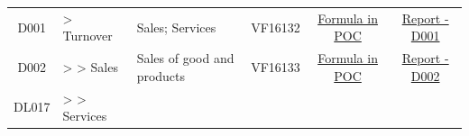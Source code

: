 \documentclass[]{book}
\begin{document}
\begin{longtable}[]{@{}cllccc@{}}
\begin{minipage}[t]{0.08\columnwidth}
D001\strut
\end{minipage} & \begin{minipage}[t]{0.20\columnwidth}\raggedright
\textgreater{} Turnover\strut
\end{minipage} & \begin{minipage}[t]{0.16\columnwidth}\raggedright
Sales; Services\strut
\end{minipage} & \begin{minipage}[t]{0.09\columnwidth}\centering
VF16132\strut
\end{minipage} & \begin{minipage}[t]{0.15\columnwidth}\centering
\protect\hyperlink{d001---formula-in-poc}{Formula in POC}\strut
\end{minipage} & \begin{minipage}[t]{0.16\columnwidth}\centering
\href{./Auxiliary\%20Files/technical_reports/variable_report/D001(!).pdf}{Report - D001}\strut
\end{minipage}\tabularnewline
\begin{minipage}[t]{0.08\columnwidth}\centering
D002\strut
\end{minipage} & \begin{minipage}[t]{0.20\columnwidth}\raggedright
\textgreater{} \textgreater{} Sales\strut
\end{minipage} & \begin{minipage}[t]{0.16\columnwidth}\raggedright
Sales of good and products\strut
\end{minipage} & \begin{minipage}[t]{0.09\columnwidth}\centering
VF16133\strut
\end{minipage} & \begin{minipage}[t]{0.15\columnwidth}\centering
\protect\hyperlink{d002---formula-in-poc}{Formula in POC}\strut
\end{minipage} & \begin{minipage}[t]{0.16\columnwidth}\centering
\href{./Auxiliary\%20Files/technical_reports/variable_report/D002.pdf}{Report - D002}\strut
\end{minipage}\tabularnewline
\begin{minipage}[t]{0.08\columnwidth}\centering
DL017\strut
\end{minipage} & \begin{minipage}[t]{0.20\columnwidth}\raggedright
\textgreater{} \textgreater{} Services\strut
\end{minipage} & \begin{minipage}[t]{0.16\columnwidth}\raggedright

\end{minipage}
\end{longtable}
\end{document}

